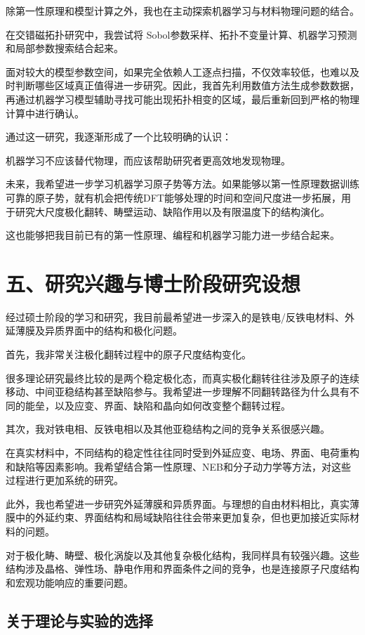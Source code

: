 除第一性原理和模型计算之外，我也在主动探索机器学习与材料物理问题的结合。

在交错磁拓扑研究中，我尝试将 Sobol参数采样、拓扑不变量计算、机器学习预测和局部参数搜索结合起来。

面对较大的模型参数空间，如果完全依赖人工逐点扫描，不仅效率较低，也难以及时判断哪些区域真正值得进一步研究。因此，我首先利用数值方法生成参数数据，再通过机器学习模型辅助寻找可能出现拓扑相变的区域，最后重新回到严格的物理计算中进行确认。

通过这一研究，我逐渐形成了一个比较明确的认识：

机器学习不应该替代物理，而应该帮助研究者更高效地发现物理。

未来，我希望进一步学习机器学习原子势等方法。如果能够以第一性原理数据训练可靠的原子势，就有机会把传统DFT能够处理的时间和空间尺度进一步拓展，用于研究大尺度极化翻转、畴壁运动、缺陷作用以及有限温度下的结构演化。

这也能够把我目前已有的第一性原理、编程和机器学习能力进一步结合起来。

\section{五、研究兴趣与博士阶段研究设想}

经过硕士阶段的学习和研究，我目前最希望进一步深入的是铁电/反铁电材料、外延薄膜及异质界面中的结构和极化问题。

首先，我非常关注极化翻转过程中的原子尺度结构变化。

很多理论研究最终比较的是两个稳定极化态，而真实极化翻转往往涉及原子的连续移动、中间亚稳结构甚至缺陷参与。我希望进一步理解不同翻转路径为什么具有不同的能垒，以及应变、界面、缺陷和晶向如何改变整个翻转过程。

其次，我对铁电相、反铁电相以及其他亚稳结构之间的竞争关系很感兴趣。

在真实材料中，不同结构的稳定性往往同时受到外延应变、电场、界面、电荷重构和缺陷等因素影响。我希望结合第一性原理、NEB和分子动力学等方法，对这些过程进行更加系统的研究。

此外，我也希望进一步研究外延薄膜和异质界面。与理想的自由材料相比，真实薄膜中的外延约束、界面结构和局域缺陷往往会带来更加复杂，但也更加接近实际材料的问题。

对于极化畴、畴壁、极化涡旋以及其他复杂极化结构，我同样具有较强兴趣。这些结构涉及晶格、弹性场、静电作用和界面条件之间的竞争，也是连接原子尺度结构和宏观功能响应的重要问题。

\subsection*{关于理论与实验的选择}

